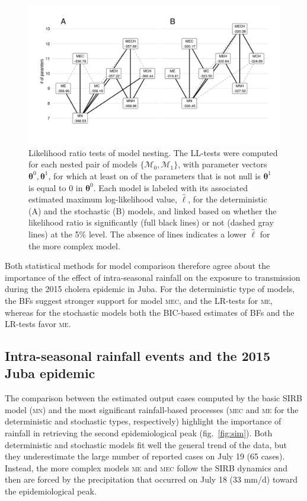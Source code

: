 \begin{figure}
    \centering
    \includegraphics[width = \textwidth, trim = 11mm 19mm 10mm 12mm, clip]{fig_cholera-rainfall/Lemaitre_ACTROP_2018_42_R1_fig3.png}
    \caption[Likelihood ratio tests of model nesting]{Likelihood ratio tests of model nesting. The LL-tests were computed for each nested pair of models $\{\mathcal{M}_0, \mathcal{M}_1\}$, with parameter vectors $\boldsymbol{\theta}^0,\boldsymbol{\theta}^1$, for which at least on of the parameters that is not null is $\boldsymbol{\theta}^1$ is equal to $0$ in $\boldsymbol{\theta}^0$. Each model is labeled with its associated estimated maximum log-likelihood value, $\hat{\ell}$, for the deterministic (A) and the stochastic (B) models, and linked based on whether the likelihood ratio is significantly (full black lines) or not (dashed gray lines) at the 5\% level. The absence of lines indicates a lower $\hat{\ell}$ for the more complex model.} 
    \label{fig:lltests}
\end{figure}


Both statistical methods for model comparison therefore agree about the importance of the effect of intra-seasonal rainfall on the exposure to transmission during the 2015 cholera epidemic in Juba. For the deterministic type of models, the BFs suggest stronger support for model \textsc{mec}, and the LR-tests for \textsc{me}, whereas for the stochastic models both the BIC-based estimates of BFs and the LR-tests favor \textsc{me}. 

\subsection{Intra-seasonal rainfall events and the 2015 Juba epidemic}

The comparison between the estimated output cases computed by the basic SIRB model (\textsc{mn}) and the most significant rainfall-based processes (\textsc{mec} and \textsc{me} for the deterministic and stochastic types, respectively) highlight the importance of rainfall in retrieving the second epidemiological peak (fig.~\ref{fig:sim}). Both deterministic and stochastic models fit well the general trend of the data, but they underestimate the large number of reported cases on July 19 (65 cases). Instead, the more complex models \textsc{me} and \textsc{mec} follow the SIRB dynamics and then are forced by the precipitation that occurred on July 18 (33 mm/d) toward the epidemiological peak. 
%

